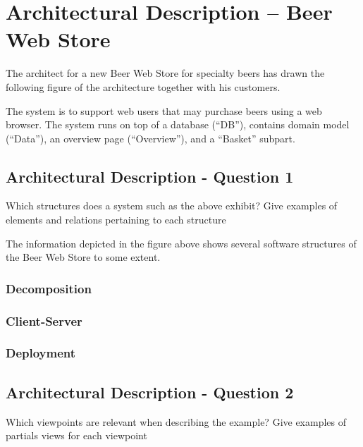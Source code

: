 \section{Architectural Description -- Beer Web Store}

The architect for a new Beer Web Store for specialty beers has drawn
the following figure of the architecture together with his customers.
\begin{figure}[h!]
  \centerline{}
\end{figure}
The system is to support web users that may purchase beers using a web
browser. The system runs on top of a database (``DB''), contains
domain model (``Data''), an overview page (``Overview''), and a
``Basket'' subpart.

\subsection{Architectural Description - Question 1}

\begin{question}
Which structures does a system such as the above exhibit?
Give examples of elements and relations pertaining to each
structure
\end{question}


The information depicted in the figure above shows several
software structures of the Beer Web Store to some extent.

\subsubsection{Decomposition}

\subsubsection{Client-Server}

\subsubsection{Deployment}

\subsection{Architectural Description - Question 2}

\begin{question}
Which viewpoints are relevant when describing the example?
Give examples of partials views for each viewpoint
\end{question}

